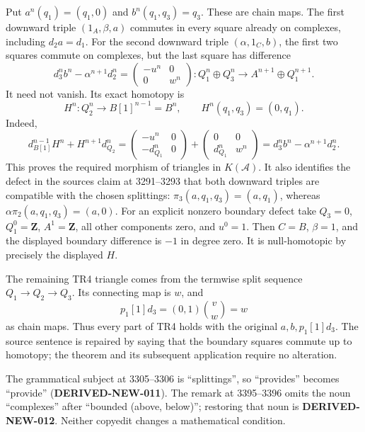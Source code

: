 Put \(a^n(q_1)=(q_1,0)\) and \(b^n(q_1,q_3)=q_3\). These are chain maps. The first downward triple \((1_A,\beta,a)\) commutes in every square already on complexes,\allowbreak{} including \(d_2a=d_1\). For the second downward triple \((\alpha,1_C,b)\),\allowbreak{} the first two squares commute on complexes,\allowbreak{} but the last square has difference \[
d_3^nb^n-\alpha^{n+1}d_2^n
=\begin{pmatrix}-u^n&0\\0&w^n\end{pmatrix}:
Q_1^n\oplus Q_3^n\to A^{n+1}\oplus Q_1^{n+1}.
\] It need not vanish. Its exact homotopy is \[
H^n:Q_2^n\longrightarrow B[1]^{n-1}=B^n,
\qquad H^n(q_1,q_3)=(0,q_1).
\] Indeed,\allowbreak{} \[
d_{B[1]}^{n-1}H^n+H^{n+1}d_{Q_2}^n
=\begin{pmatrix}-u^n&0\\-d_{Q_1}^n&0\end{pmatrix}
+\begin{pmatrix}0&0\\d_{Q_1}^n&w^n\end{pmatrix}
=d_3^nb^n-\alpha^{n+1}d_2^n.
\] This proves the required morphism of triangles in \(K(\mathcal A)\). It also identifies the defect in the source\textquotesingle s claim at 3291–\allowbreak{}3293 that both downward triples are compatible with the chosen splittings:\allowbreak{} \(\pi_3(a,q_1,q_3)=(a,q_1)\),\allowbreak{} whereas \(\alpha\pi_2(a,q_1,q_3)=(a,0)\). For an explicit nonzero boundary defect take \(Q_3=0\),\allowbreak{} \(Q_1^0=\mathbf Z\),\allowbreak{} \(A^1=\mathbf Z\),\allowbreak{} all other components zero,\allowbreak{} and \(u^0=1\). Then \(C=B\),\allowbreak{} \(\beta=1\),\allowbreak{} and the displayed boundary difference is \(-1\) in degree zero. It is null-homotopic by precisely the displayed \(H\).

The remaining TR4 triangle comes from the termwise split sequence \(Q_1\to Q_2\to Q_3\). Its connecting map is \(w\),\allowbreak{} and \[
p_1[1]d_3=(0,1)\binom v w=w
\] as chain maps. Thus every part of TR4 holds with the original \(a,b,p_1[1]d_3\). The source sentence is repaired by saying that the boundary squares commute up to homotopy; the theorem and its subsequent application require no alteration.

The grammatical subject at 3305–\allowbreak{}3306 is “splittings”,\allowbreak{} so ``provides'' becomes ``provide'' (\textbf{DERIVED-NEW-011})\allowbreak{}. The remark at 3395–\allowbreak{}3396 omits the noun ``complexes'' after ``bounded (above,\allowbreak{} below)\allowbreak{}”; restoring that noun is \textbf{DERIVED-NEW-012}. Neither copyedit changes a mathematical condition.

